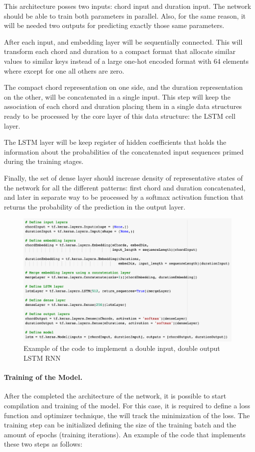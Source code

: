 This architecture posses two inputs: chord input and duration input. The network should be
able to train both parameters in parallel. Also, for the same reason, it will be needed
two outputs for predicting exactly those same parameters.

After each input, and embedding layer will be sequentially connected. This will transform
each chord and duration to a compact format that allocate similar values to similar keys
instead of a large one-hot encoded format with 64 elements where except for one all others
are zero.

The compact chord representation on one side, and the duration representation on the
other, will be concatenated in a single input. This step will keep the association of each
chord and duration placing them in a single data structures ready to be processed by the
core layer of this data structure: the LSTM cell layer.

The LSTM layer will be keep register of hidden coefficients that holds the information
about the probabilities of the concatenated input sequences primed during the training
stages.

Finally, the set of dense layer should increase density of representative states of the
network for all the different patterns: first chord and duration concatenated, and later
in separate way to be processed by a softmax activation function that returns the
probability of the prediction in the output layer.

\begin{figure}[h!]
  \includegraphics[width=\linewidth]{image/fig_JDF22.png}
  \caption{Example of the code to implement a double input, double output LSTM RNN }
\end{figure}


\paragraph{Training of the Model.} After the completed the architecture of the network, it is possible
to start compilation and training of the model. For this case, it is required to define a
loss function and optimizer technique, the will track the minimization of the loss. The
training step can be initialized defining the size of the training batch and the amount of
epochs (training iterations). An example of the code that implements these two steps as
follows:

